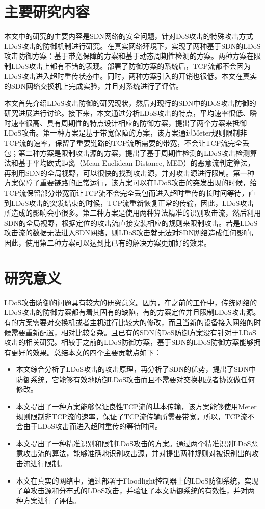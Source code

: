 \section{主要研究内容}
\label{sec:work}
本文中的研究的主要内容是SDN网络的安全问题，针对DoS攻击的特殊攻击方式LDoS攻击的防御机制进行研究。在真实网络环境下，实现了两种基于SDN的LDoS攻击防御方案：基于带宽保障的方案和基于动态周期性检测的方案。两种方案在限制LDoS攻击上都有不错的表现。部署了防御方案的系统后，TCP流都不会因为LDoS攻击进入超时重传状态中。同时，两种方案引入的开销也很低。本文在真实的SDN网络交换机上完成实验，并且对系统进行了评估。

本文首先介绍LDoS攻击防御的研究现状，然后对现行的SDN中的DoS攻击防御的研究进展进行讨论。接下来，本文通过分析LDoS攻击的特点，平均速率很低、瞬时速率很高、具有周期性的特点设计相应的防御方案，提出了两个方案来抵御LDoS攻击。第一种方案是基于带宽保障的方案，该方案通过Meter规则限制非TCP流的速率，保留了重要链路的TCP流所需要的带宽，不会让TCP流完全丢包；第二种方案是限制攻击源的方案，提出了基于周期性检测的LDoS攻击检测算法和基于平均欧式距离（Mean Euclidean Distance, MED）的恶意流判定算法，再利用SDN的全局视野，可以很快的找到攻击源，并对攻击源进行限制。第一种方案保障了重要链路的正常运行，该方案可以在LDoS攻击的突发出现的时候，给TCP流保留部分带宽而让TCP流不会完全丢包而进入超时重传的长时间等待，直到LDoS攻击的突发结束的时候，TCP流重新恢复正常的传输，因此，LDoS攻击所造成的影响会小很多。第二种方案是使用两种算法精准的识别攻击流，然后利用SDN的全局视野，根据定位的攻击流直接安装相应的规则来限制攻击。若是LDoS攻击流的数据无法进入SDN网络，则LDoS攻击就无法对SDN网络造成任何影响，因此，使用第二种方案可以达到比已有的解决方案更加好的效果。


\section{研究意义}
\label{sec:contribution}
LDoS攻击防御的问题具有较大的研究意义。因为，在之前的工作中，传统网络的LDoS攻击的防御方案都有着其固有的缺陷，有的方案定位并且限制LDoS攻击源。有的方案需要对交换机或者主机进行比较大的修改，而且当新的设备接入网络的时候需要重新配置，相对比较复杂。且已有的SDN的DoS防御方案没有针对于LDoS攻击的相关研究。相较于之前的LDoS防御方案，基于SDN的LDoS防御方案能够拥有更好的效果。总结本文的四个主要贡献点如下：

\begin{itemize}
    \item 本文综合分析了LDoS攻击的攻击原理，再分析了SDN的优势，提出了SDN中防御系统，它能够有效地防御LDoS攻击而且不需要对交换机或者协议做任何修改。
    \item 本文提出了一种方案能够保证良性TCP流的基本传输，该方案能够使用Meter规则限制非TCP流的速率，保证了TCP流传输所需要带宽。所以，TCP流不会由于LDoS攻击而进入超时重传的等待时间。
    \item 本文提出了一种精准识别和限制LDoS攻击的方案。通过两个精准识别LDoS恶意攻击流的算法，能够准确地识别攻击源，并对提出两种规则对被识别出的攻击流进行限制。
    \item 本文在真实的网络中，通过部署于Floodlight控制器上的LDoS防御系统，实现了单攻击源和分布式的LDoS攻击，并验证了本文防御系统的有效性，并对两种方案进行了评估。
\end{itemize}

